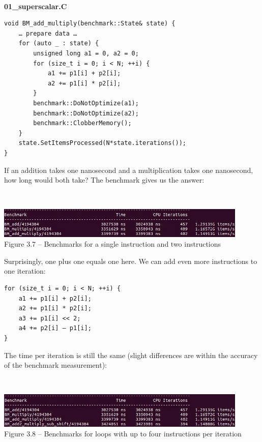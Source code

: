 \hspace*{\fill} \\ %
\noindent
\textbf{01\_superscalar.C}
\begin{lstlisting}[style=styleCXX]
void BM_add_multiply(benchmark::State& state) {
	… prepare data …
	for (auto _ : state) {
		unsigned long a1 = 0, a2 = 0;
		for (size_t i = 0; i < N; ++i) {
			a1 += p1[i] + p2[i];
			a2 += p1[i] * p2[i];
		}
		benchmark::DoNotOptimize(a1);
		benchmark::DoNotOptimize(a2);
		benchmark::ClobberMemory();
	}
	state.SetItemsProcessed(N*state.iterations());
}
\end{lstlisting}

If an addition takes one nanosecond and a multiplication takes one nanosecond, how long would both take? The benchmark gives us the answer:

\hspace*{\fill} \\ %
\begin{center}
\includegraphics[width=0.9\textwidth]{content/1/chapter3/images/7.jpg}\\
Figure 3.7 – Benchmarks for a single instruction and two instructions
\end{center}

Surprisingly, one plus one equals one here. We can add even more instructions to one iteration:

\begin{lstlisting}[style=styleCXX]
for (size_t i = 0; i < N; ++i) {
	a1 += p1[i] + p2[i];
	a2 += p1[i] * p2[i];
	a3 += p1[i] << 2;
	a4 += p2[i] – p1[i];
}
\end{lstlisting}

The time per iteration is still the same (slight differences are within the accuracy of the benchmark measurement):

\hspace*{\fill} \\ %
\begin{center}
\includegraphics[width=0.9\textwidth]{content/1/chapter3/images/8.jpg}\\
Figure 3.8 – Benchmarks for loops with up to four instructions per iteration
\end{center}

